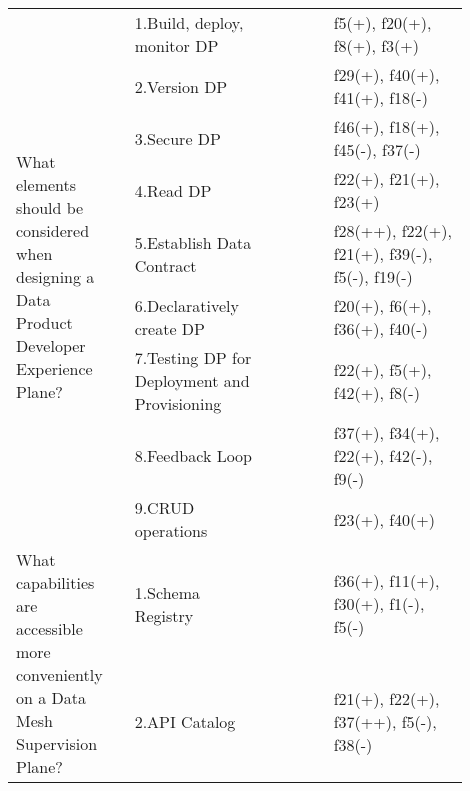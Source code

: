 \begin{tabular}{|p{0.12\linewidth}|p{0.015\linewidth}|p{0.3\linewidth}|p{0.15\linewidth}|p{0.31\linewidth}|}
\multirow{9}{\linewidth}{What elements should be considered when designing a Data Product Developer Experience Plane?} &\cellcolor{emerald_shape_7}{} &1.Build, deploy, monitor DP&\cellcolor{emerald_shape_4}{s3, s5, s9, s11, s13, s15, s16, s17, s18, s31, s33, s39, s42, p5, p6} & f5(+), f20(+), f8(+), f3(+)\\
 & \cellcolor{emerald_shape_7}{} & 2.Version DP&\cellcolor{emerald_shape_4}{s5, s30, s31, s33, p1, p2, p3, p4, p5, p6} & f29(+), f40(+), f41(+), f18(-)\\
 & \cellcolor{emerald_shape_7}{} & 3.Secure DP&\cellcolor{emerald_shape_6}{s2, s3, s5, s7, s8, s9, s11, s13, s15, s16, s17, s24, s26, s27, s28, s29, s30, s31, s32, s33, s35, s42, s43, p1, p3, p4} & f46(+), f18(+), f45(-), f37(-)\\
 & \cellcolor{emerald_shape_7}{} & 4.Read DP&\cellcolor{emerald_shape_4}{s2, s5, s9, s11, s26, s27, s30, s42, p6} & f22(+), f21(+), f23(+)\\
 & \cellcolor{emerald_shape_7}{} & 5.Establish Data Contract&\cellcolor{emerald_shape_3}{s11, s17, s34, s40, p1, p2, p5} & f28(++), f22(+), f21(+), f39(-), f5(-), f19(-)\\
 & \cellcolor{emerald_shape_7}{} & 6.Declaratively create DP&\cellcolor{emerald_shape_5}{s4, s5, s11, s12, s13, s17, s19, s20, s27, s28, s30, s31, s33, s39, p3, p4, p6} & f20(+), f6(+), f36(+), f40(-)\\
 & \cellcolor{emerald_shape_7}{} & 7.Testing DP for Deployment and Provisioning&\cellcolor{emerald_shape_4}{s6, s18, s25, p1, p2, p3, p4, p5, p6} & f22(+), f5(+), f42(+), f8(-)\\
 & \cellcolor{emerald_shape_7}{} & 8.Feedback Loop&\cellcolor{emerald_shape_3}{s10, s39, p3, p4, p5} & f37(+), f34(+), f22(+), f42(-), f9(-)\\
 & \multirow{-9}{\linewidth}{ \cellcolor{emerald_shape_7}{43}} &9.CRUD operations&\cellcolor{emerald_shape_3}{s21, s41, p2, p3, p4, p5, p6} & f23(+), f40(+)\\
\multirow{4}{\linewidth}{What capabilities are accessible more conveniently on a Data Mesh Supervision Plane?} &\cellcolor{emerald_shape_7}{} &1.Schema Registry&\cellcolor{emerald_shape_4}{s4, s8, s12, s16, s32, s35, s36, p1, p2, p3, p4, p5} & f36(+), f11(+), f30(+), f1(-), f5(-)\\
 & \cellcolor{emerald_shape_7}{} & 2.API Catalog&\cellcolor{emerald_shape_7}{s1, s7, s8, s9, s10, s11, s14, s15, s17, s18, s21, s25, s29, s30, s31, s32, s34, s37, s38, s39, s40, s41, s42, p1, p2, p3, p4, p5, p6} & f21(+), f22(+), f37(++), f5(-), f38(-)\\

\end{tabular}
